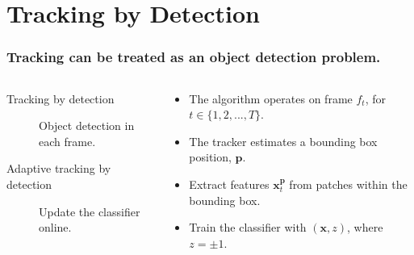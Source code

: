 \section{Tracking by Detection}

\begin{frame}
    \frametitle{Tracking can be treated as an object detection problem.}
    \begin{columns}[T]
        \begin{column}{0.5\textwidth}
            \begin{description}
                \item [Tracking by detection] Object detection in each frame.
                \item [Adaptive tracking by detection] Update the classifier online.
            \end{description}
        \end{column}
        \begin{column}{0.5\textwidth}
            \begin{itemize}
                \item The algorithm operates on frame \(f_t\), for \(t \in \{1, 2, ..., T\}\).
                \item The tracker estimates a bounding box position, \(\mathbf{p}\).
                \item Extract features \(\mathbf{x}_t^\mathbf{p}\) from patches within the bounding box.
                \item Train the classifier with \((\mathbf{x}, z)\), where \(z = \pm1\).
            \end{itemize}
        \end{column}
    \end{columns}
\end{frame}

